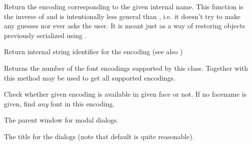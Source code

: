 Return the encoding corresponding to the given internal name. This function is
the inverse of  and is
intentionally less general than 
, i.e. it doesn't
try to make any guesses nor ever asks the user. It is meant just as a way of
restoring objects previously serialized using 
.


\label{wxfontmappergetencodingname}


Return internal string identifier for the encoding (see also 
)




\label{wxfontmappergetsupportedencodingscount}


Returns the number of the font encodings supported by this class. Together with 
 this method may be used to get
all supported encodings.


\label{wxfontmapperisencodingavailable}


Check whether given encoding is available in given face or not.
If no facename is given, find {\it any} font in this encoding.


\label{wxfontmappersetdialogparent}


The parent window for modal dialogs.


\label{wxfontmappersetdialogtitle}


The title for the dialogs (note that default is quite reasonable).


